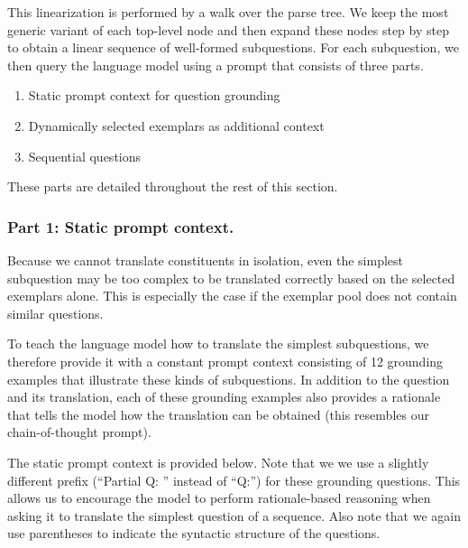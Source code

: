 \documentclass{article} \usepackage{iclr2022_conference,times}
\begin{document}
This linearization is performed by a walk over the parse tree. We keep the most generic variant of each top-level node and then expand these nodes step by step to obtain a linear sequence of well-formed subquestions. For each subquestion, we then query the language model using a prompt that consists of three parts.

\begin{enumerate}
    \item Static prompt context for question grounding
    \item Dynamically selected exemplars as additional context
    \item Sequential questions
\end{enumerate}

These parts are detailed throughout the rest of this section.

\subsubsection{Part 1: Static prompt context.}
Because we cannot translate constituents in isolation, even the simplest subquestion may be too complex to be translated correctly based on the selected exemplars alone. This is especially the case if the exemplar pool does not contain similar questions.

To teach the language model how to translate the simplest subquestions, we therefore provide it with a constant prompt context consisting of 12 grounding examples that illustrate these kinds of subquestions. In addition to the question and its translation, each of these grounding examples also provides a rationale that tells the model how the translation can be obtained (this resembles our chain-of-thought prompt).

The static prompt context is provided below. Note that we we use a slightly different prefix (``Partial Q: '' instead of ``Q:'') for these grounding questions. This allows us to encourage the model to perform rationale-based reasoning when asking it to translate the simplest question of a sequence. Also note that we again use parentheses to indicate the syntactic structure of the questions.
\end{document}
